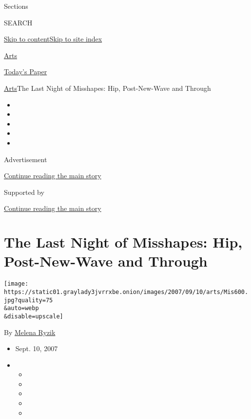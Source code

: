 Sections

SEARCH

\protect\hyperlink{site-content}{Skip to
content}\protect\hyperlink{site-index}{Skip to site index}

\href{https://www.nytimes3xbfgragh.onion/section/arts}{Arts}

\href{https://myaccount.nytimes3xbfgragh.onion/auth/login?response_type=cookie\&client_id=vi}{}

\href{https://www.nytimes3xbfgragh.onion/section/todayspaper}{Today's
Paper}

\href{/section/arts}{Arts}\textbar{}The Last Night of Misshapes: Hip,
Post-New-Wave and Through

\begin{itemize}
\item
\item
\item
\item
\item
\end{itemize}

Advertisement

\protect\hyperlink{after-top}{Continue reading the main story}

Supported by

\protect\hyperlink{after-sponsor}{Continue reading the main story}

\hypertarget{the-last-night-of-misshapes-hip-post-new-wave-and-through}{%
\section{The Last Night of Misshapes: Hip, Post-New-Wave and
Through}\label{the-last-night-of-misshapes-hip-post-new-wave-and-through}}

\texttt{[image: https://static01.graylady3jvrrxbe.onion/images/2007/09/10/arts/Mis600.jpg?quality=75\\\&auto=webp\\\&disable=upscale]}

By \href{https://www.nytimes3xbfgragh.onion/by/melena-ryzik}{Melena
Ryzik}

\begin{itemize}
\item
  Sept. 10, 2007
\item
  \begin{itemize}
  \item
  \item
  \item
  \item
  \item
  \end{itemize}
\end{itemize}

